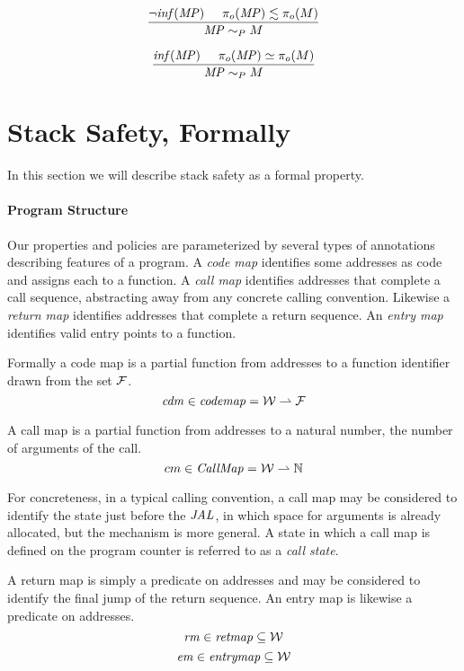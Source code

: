 \documentclass[acmsmall,review,anonymous]{acmart}\settopmatter{printfolios=true,printccs=false,printacmref=false}
\begin{document}
\[\frac{\neg \mathit{inf}(\mathit{MP}) \hspace{.5cm} \pi_o(\mathit{MP}) \lesssim \pi_o(M)}
           {\mathit{MP} \sim_P M}\]

\[\frac{\mathit{inf}(\mathit{MP}) \hspace{.5cm} \pi_o(\mathit{MP}) \simeq \pi_o(M)}
           {\mathit{MP} \sim_P M}\]

\section{Stack Safety, Formally}

In this section we will describe stack safety as a formal
property.

\paragraph*{Program Structure}

  Our properties and policies are parameterized by several types of annotations
  describing features of a program. A {\em code map} identifies some addresses
  as code and assigns each to a function. A {\em call map} identifies addresses
  that complete a call sequence, abstracting away from any concrete calling
  convention. Likewise a {\em return map} identifies addresses that complete a
  return sequence. An {\em entry map} identifies valid entry points to a
  function.

  Formally a code map is a partial function from addresses to a function
  identifier drawn from the set \(\mathcal{F}\).
  \[\mathit{cdm} \in \mathit{codemap} = {\mathcal W} \rightharpoonup \mathcal{F}\]

  A call map is a partial function from addresses to a natural number,
  the number of arguments of the call.
  \[cm \in \mathit{CallMap} = {\mathcal W} \rightharpoonup \mathbb{N}\]

  For concreteness, in a typical calling convention, a call map may be
  considered to identify the state just before the \(\mathit{JAL}\), in which
  space for arguments is already allocated, but the mechanism is more
  general. A state in which a call map is defined on the program counter is
  referred to as a {\it call state}.
  
  A return map is simply a predicate on addresses and may be considered to
  identify the final jump of the return sequence. An entry map is likewise a
  predicate on addresses.
  \[\mathit{rm} \in \mathit{retmap} \subseteq {\mathcal W}\]
  \[\mathit{em} \in \mathit{entrymap} \subseteq {\mathcal W}\]
\end{document}

